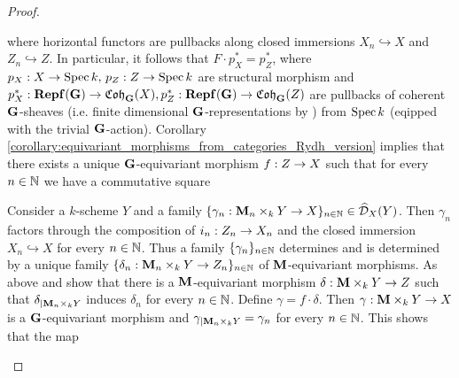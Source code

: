 \begin{proof}
\begin{itemize}
\begin{center}
\end{center}
where horizontal functors are pullbacks along closed immersions $X_n\hookrightarrow X$ and $Z_n\hookrightarrow Z$. In particular, it follows that $F\cdot p^*_X = p^*_Z$, where $p_X:X\rightarrow \mathrm{Spec}\, k,\,p_Z:Z\rightarrow \mathrm{Spec}\, k$ are structural morphism and $p_X^*:\mathbf{Repf}(\mathbf{G})\rightarrow \mathfrak{Coh}_{\mathbf{G}}(X),p_Z^*:\mathbf{Repf}(\mathbf{G})\rightarrow \mathfrak{Coh}_{\mathbf{G}}(Z)$ are pullbacks of coherent $\mathbf{G}$-sheaves (i.e. finite dimensional $\mathbf{G}$-representations by {\cite[Example 4.7]{Algebraization}}) from $\mathrm{Spec}\, k$ (eqipped with the trivial $\mathbf{G}$-action). Corollary \ref{corollary:equivariant_morphisms_from_categories_Rydh_version} implies that there exists a unique $\mathbf{G}$-equivariant morphism $f:Z\rightarrow X$ such that for every $n\in {\mathbb N}$ we have a commutative square
\begin{center}
\end{center}
Consider a $k$-scheme $Y$ and a family $\{\gamma_n:\mathbf{M}_n\times_kY\rightarrow X\}_{n\in {\mathbb N}}\in \widehat{{\mathcal D}}_X(Y)$. Then $\gamma_n$ factors through the composition of $i_n:Z_n\rightarrow X_n$ and the closed immersion $X_n\hookrightarrow X$ for every $n\in {\mathbb N}$. Thus a family $\{\gamma_n\}_{n\in {\mathbb N}}$ determines and is determined by a unique family $\{\delta_n:\mathbf{M}_n\times_kY\rightarrow Z_n\}_{n\in {\mathbb N}}$ of $\mathbf{M}$-equivariant morphisms. As above {\cite[Example 7.3]{Algebraization}} and {\cite[Corollary 7.4]{Algebraization}} show that there is a $\mathbf{M}$-equivariant morphism $\delta:\mathbf{M}\times_kY\rightarrow Z$ such that $\delta_{\mid \mathbf{M}_n\times_kY}$ induces $\delta_n$ for every $n\in {\mathbb N}$. Define $\gamma = f\cdot \delta$. Then $\gamma:\mathbf{M}\times_kY\rightarrow X$ is a $\mathbf{G}$-equivariant morphism and $\gamma_{\mid \mathbf{M}_n\times_kY} = \gamma_n$ for every $n\in {\mathbb N}$. This shows that the map

\end{itemize}
\end{proof}
